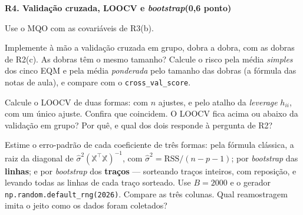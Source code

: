\documentclass[11pt,a4paper]{article}
\newcommand{\tarefa}[3]{%
  \bigskip\par\noindent
  {\large\bfseries\color{azulufrj}#1. #2}\hfill{\bfseries(#3)}\par
  \nopagebreak\vspace{0.3em}}
\newcommand{\cod}[1]{\texttt{#1}}
\begin{document}
\tarefa{R4}{Validação cruzada, LOOCV e \emph{bootstrap}}{0,6 ponto}
Use o MQO com as covariáveis de R3(b).

\begin{itens}
  \item Implemente à mão a validação cruzada em grupo, dobra a dobra, com as dobras
        de R2(c). As dobras têm o mesmo tamanho? Calcule o risco pela média
        \emph{simples} dos cinco EQM e pela média \emph{ponderada} pelo tamanho das
        dobras (a fórmula das notas de aula), e compare com o
        \cod{cross\_val\_score}.
  \item Calcule o LOOCV de duas formas: com $n$ ajustes, e pelo atalho da
        \emph{leverage} $h_{ii}$, com um único ajuste. Confira
        que coincidem. O LOOCV fica acima ou abaixo da validação em grupo? Por quê, e
        qual dos dois responde à pergunta de R2?
  \item Estime o erro-padrão de cada coeficiente de três formas: pela fórmula
        clássica, a raiz da diagonal de
        $\widehat\sigma^2(\mathbb{X}^\top\mathbb{X})^{-1}$, com
        $\widehat\sigma^2=\text{RSS}/(n-p-1)$; por \emph{bootstrap} das
        \textbf{linhas}; e por \emph{bootstrap} dos \textbf{traços} --- sorteando traços
        inteiros, com reposição, e levando todas as linhas de cada traço sorteado. Use
        $B=2000$ e o gerador \cod{np.random.default\_rng(2026)}. Compare as três
        colunas. Qual reamostragem imita o jeito como os dados foram coletados?
\end{itens}
\end{document}
